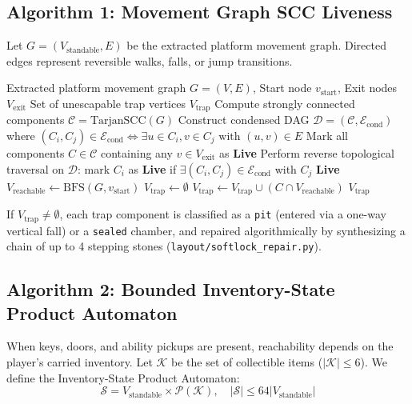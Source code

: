 \documentclass[11pt,a4paper]{report}
\theoremstyle{definition}
\theoremstyle{remark}
\begin{document}
\subsection{Algorithm 1: Movement Graph SCC Liveness}
Let $G = (V_{\text{standable}}, E)$ be the extracted platform movement graph. Directed edges represent reversible walks, falls, or jump transitions.

\begin{algorithm}[H]
\caption{Tarjan SCC Condensation for Movement Trap Detection}
\label{alg:scc_softlock}
\begin{algorithmic}[1]
\Require Extracted platform movement graph $G = (V, E)$, Start node $v_{\text{start}}$, Exit nodes $V_{\text{exit}}$
\Ensure Set of unescapable trap vertices $V_{\text{trap}}$
\State Compute strongly connected components $\mathcal{C} = \text{TarjanSCC}(G)$
\State Construct condensed DAG $\mathcal{D} = (\mathcal{C}, \mathcal{E}_{\text{cond}})$ where $(C_i, C_j) \in \mathcal{E}_{\text{cond}} \iff \exists u \in C_i, v \in C_j \text{ with } (u, v) \in E$
\State Mark all components $C \in \mathcal{C}$ containing any $v \in V_{\text{exit}}$ as \textbf{Live}
\State Perform reverse topological traversal on $\mathcal{D}$: mark $C_i$ as \textbf{Live} if $\exists (C_i, C_j) \in \mathcal{E}_{\text{cond}}$ with $C_j$ \textbf{Live}
\State $V_{\text{reachable}} \gets \text{BFS}(G, v_{\text{start}})$
\State $V_{\text{trap}} \gets \emptyset$
        \State $V_{\text{trap}} \gets V_{\text{trap}} \cup (C \cap V_{\text{reachable}})$
    \EndIf
\EndFor
\State \Return $V_{\text{trap}}$
\end{algorithmic}
\end{algorithm}

If $V_{\text{trap}} \ne \emptyset$, each trap component is classified as a \texttt{pit} (entered via a one-way vertical fall) or a \texttt{sealed} chamber, and repaired algorithmically by synthesizing a chain of up to 4 stepping stones (\texttt{layout/softlock\_repair.py}).

\subsection{Algorithm 2: Bounded Inventory-State Product Automaton}
When keys, doors, and ability pickups are present, reachability depends on the player's carried inventory. Let $\mathcal{K}$ be the set of collectible items ($|\mathcal{K}| \le 6$). We define the Inventory-State Product Automaton:
\begin{equation}
    \mathcal{S} = V_{\text{standable}} \times \mathcal{P}(\mathcal{K}), \quad |\mathcal{S}| \le 64 |V_{\text{standable}}|
\end{equation}
\end{document}
